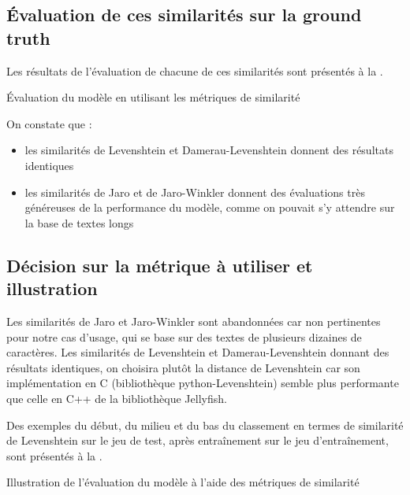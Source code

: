             \subsection{\'{E}valuation de ces similarités sur la ground truth}

            Les résultats de l'évaluation de chacune de ces similarités sont présentés à la .
            \begin{table}[htbp]
                \begin{center}
                
                \caption{\'{E}valuation du modèle en utilisant les métriques de similarité}
                \label{tbl:similarities_result}
                \end{center}
            \end{table}
            On constate que :
            \begin{itemize}
                \item les similarités de Levenshtein et Damerau-Levenshtein donnent des résultats identiques
                \item les similarités de Jaro et de Jaro-Winkler donnent des évaluations très généreuses de la performance du modèle, comme on pouvait s'y attendre sur la base de textes longs
            \end{itemize}

            \subsection{Décision sur la métrique à utiliser et illustration}
            
            Les similarités de Jaro et Jaro-Winkler sont abandonnées car non pertinentes pour notre cas d'usage, qui se base sur des textes de plusieurs dizaines de caractères.
            Les similarités de Levenshtein et Damerau-Levenshtein donnant des résultats identiques, on choisira plutôt la distance de Levenshtein car son implémentation en C (bibliothèque python-Levenshtein) semble plus performante que celle en C++ de la bibliothèque Jellyfish.

            Des exemples du début, du milieu et du bas du classement en termes de similarité de Levenshtein sur le jeu de test, après entraînement sur le jeu d'entraînement, sont présentés à la .
            \begin{table}[htbp]
                \begin{center}
                {\tiny
                
                }
                \caption{Illustration de l'évaluation du modèle à l'aide des métriques de similarité}
                \label{tbl:similarity_illustration}
                \end{center}
            \end{table}

